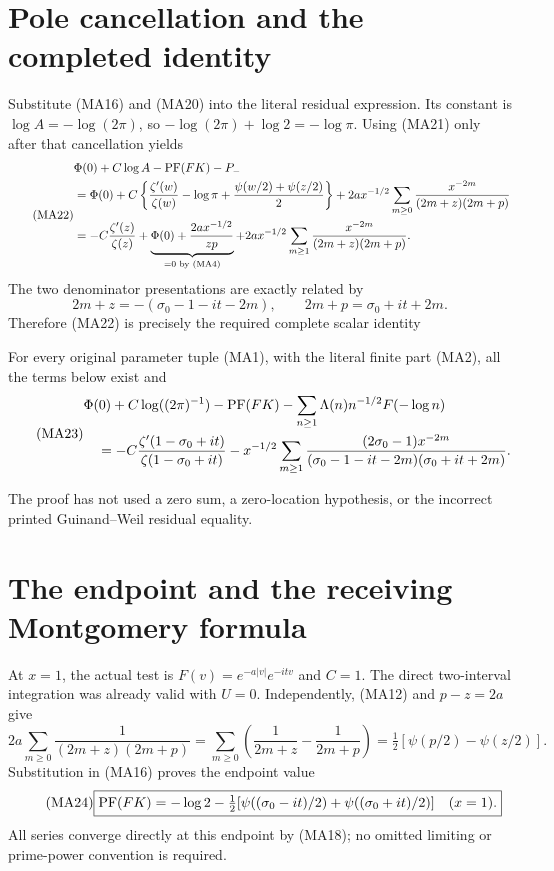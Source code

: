 \section{Pole cancellation and the completed identity}
Substitute (MA16) and (MA20) into the literal residual expression. Its
constant is $\log A=-\log(2\pi)$, so $-\log(2\pi)+\log2=-\log\pi$.
Using (MA21) only after that cancellation yields
\begin{equation}\tag{MA22}\begin{aligned}
 &\Phi(0)+C\log A-\operatorname{PF}(FK)-P_-\\
 &=\Phi(0)+C\left\{\frac{\zeta'(w)}{\zeta(w)}-\log\pi
              +\frac{\psi(w/2)+\psi(z/2)}2\right\}
       +2a x^{-1/2}\sum_{m\ge0}\frac{x^{-2m}}{(2m+z)(2m+p)}\\
 &=-C\frac{\zeta'(z)}{\zeta(z)}
   +\underbrace{\Phi(0)+\frac{2a x^{-1/2}}{zp}}_{=0\text{ by (MA4)}}
   +2a x^{-1/2}\sum_{m\ge1}\frac{x^{-2m}}{(2m+z)(2m+p)}.
\end{aligned}\end{equation}
The two denominator presentations are exactly related by
\[
 2m+z=-(\sigma_0-1-it-2m),\qquad 2m+p=\sigma_0+it+2m.
\]
Therefore (MA22) is precisely the required complete scalar identity
\begin{theorem}
For every original parameter tuple (MA1), with the literal finite part
(MA2), all the terms below exist and
\begin{equation}\tag{MA23}\begin{aligned}
 &\Phi(0)+C\log((2\pi)^{-1})-\operatorname{PF}(FK)
   -\sum_{n\ge1}\Lambda(n)n^{-1/2}F(-\log n)\\
 &\quad=-C\frac{\zeta'(1-\sigma_0+it)}{\zeta(1-\sigma_0+it)}
 -x^{-1/2}\sum_{m\ge1}
 \frac{(2\sigma_0-1)x^{-2m}}
      {(\sigma_0-1-it-2m)(\sigma_0+it+2m)}.
\end{aligned}\end{equation}
\end{theorem}
The proof has not used a zero sum, a zero-location hypothesis, or the
incorrect printed Guinand--Weil residual equality.

\section{The endpoint and the receiving Montgomery formula}
At $x=1$, the actual test is $F(v)=e^{-a|v|}e^{-itv}$ and $C=1$.
The direct two-interval integration was already valid with $U=0$.
Independently, (MA12) and $p-z=2a$ give
\[
 2a\sum_{m\ge0}\frac1{(2m+z)(2m+p)}
 =\sum_{m\ge0}\left(\frac1{2m+z}-\frac1{2m+p}\right)
 =\tfrac12[\psi(p/2)-\psi(z/2)].
\]
Substitution in (MA16) proves the endpoint value
\begin{equation}\tag{MA24}
 \boxed{\operatorname{PF}(FK)=-\log2-\tfrac12
 [\psi((\sigma_0-it)/2)+\psi((\sigma_0+it)/2)]\quad(x=1).}
\end{equation}
All series converge directly at this endpoint by (MA18); no omitted
limiting or prime-power convention is required.

